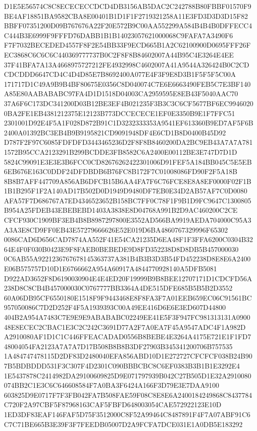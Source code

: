 \documentclass[UTF8,fontset=fandol,zihao=-4,a4paper]{ctexart}
\begin{document}
{{D1E5E56574C8C8ECECECCDCD4DB3156AB5DAC2C242788B80FBBF01570F9BE4AF18851BA9582CBA8E00401B1D1F1F2719321258A11E3FD3D3D3D15F82
BBFF07351200D09B767676A22F20E572B9C00AA552299A584B4B4B0DFFECC4C444B3E6999F9FFFD76DABB1B1B14023057621000068C9FAFA7A3490F6
F7F7032BECEDED4557F8F2E54BB33F9ECD665B1A2C62100900D0695FFF26FEC3868C6C6C6C440369777737B0C2F8F8B84602007A44B95C4E3264E4EE
37F41BFA7A13A4668975727212FE4932998C4602007A41A9544A326424B0C2CDCDCDDD6647CD4C4D4D85E7B8692400A077E4F3F9E8D3B1F5F5F5C00A
171717D1C49A9B9B4BF80675E0356C8D040074C7E6E6663490FEB5C7E3BF140A85E80AABABABC97FA4D1D1518D04003CA2959595E8EB43F5040AAC70
37A6F6C173DC341200D03B12BE3EF4B021235F3B3C3C6CF5677BF6EC99460200BA2FE1EB4381212375E12123B773DCCECECE1EF0E3350B9E1F7FFC51
2301001D92E4F5A1F028D872B91C1D3232333353A9541EF613360B9ED7AF5F6B2400A01392BC3EB4B9B9195821CD9091948DF4E6CD1B8D0400B45D92
D787F2F97C6085FDFDFD3443465236D2F8F8B8460200DA2BC9EB43A7A7A7811572B95CCA2123291B299BCDDE3FB8582C6A2400E00112BE3E747D7D1D
5824C99091E3E3E3B6FCC0CD82676262422301006D91FEF5A184BB045C5E5EB6EB676E163C0DDF24DFDBDB6B76FC8B172F7C01008086FD90F2F5A18B
8B8B7AFF447709A856AB6DFCB15B6AA4FA7F6C76FCE8E8A8EF0000F02F1B1B1B295F1F2A140AD17B502D0D1949D9480DF7EB0E34D2AB57AF7C0D0080
AFA57F7D686767A7ED4346523652B158BC7FF0C78F1F9B1D9FC9647C1300805B954A25FDEB43EBEBEBD1403A3838E8D04768A991B2D9AC460200C2CE
CFCF930C1909BF3EB4B8B8987297800E3552AD566BA9919AEDA704000C95A3A3A3E8CD9FF0EB43E57279666626E52E019D6BA4860767329996F65302
0086CAD6D656CAD7874AA552F41E54CA21235D6EA48F1F3FFA6200C0304B3264E4F0F030B0423E9F8FAEB0BEBEDE9D8FD352238D8D8DB5B457000030
0C6AB55A9221236767678145363737A381B4B3B3D3B54FD452238D8E8E6A2400E06B575757D10D1E6766662A954A60917A4844770928140A5DFB5081
D922AD3652F8D6190030904E4E4ED20F19999B9B8BEE12707171D1CDCFD56A238D8C8CB4B457000030C0767777BB3364A4DE515DFE685B5B5B2D3552
60A06DB95CF6550180E1518F9F9443468E8F8FA3F7A01EEB659EC06C91561BC957050086C7D2D252F4F5A1939393C00A49EE416D6E6E3ED607D44800
404B2A954A7483C7E9E9E9ABABABC02249EE41E5F3F947FC981313131A090048E8ECEC2CBAC1E3C2C242C3691D77A2F7A0EA7F45A9547ADC4F1A982D
A2910080AF1D1C1C446FFEACADAD0556B8BEBE4E3264A4175E721E1F1FD748004054FA2123A7A7A7D17B508B8B8B3DF27903B345341200706B757535
1A484747478115D2DF83D2480040EFA856ABD10D1E272727CFCFCF038B24B907B5BDBDDD531F3C307F4D2301C090BBBCBC8C6EF0383B3B1B1E3292E4
1E5437878C2414982DA29100609825D9E071797939B042C27B505D1E32A2910080074BB2C1E3C6C646608584F7A0BA3F6424A166F3D79E3E7DAA9100
603825D9E0717F7F3FB042FA7B508FAE59F08C8E8E6A2400184249868C8437784C720F2A97CBF5F87968163CAF5FBFD648003054CAE572922123E10D
1ED3DF83EAF146FAF5D75F3512000C8F52A99464C8487891F4F7A07ABF91C6C7C71BE665B3E39F3F7FEEDB05007D2A9FCFA7DCE031E1A0DB5E183292
}}
\end{document}
